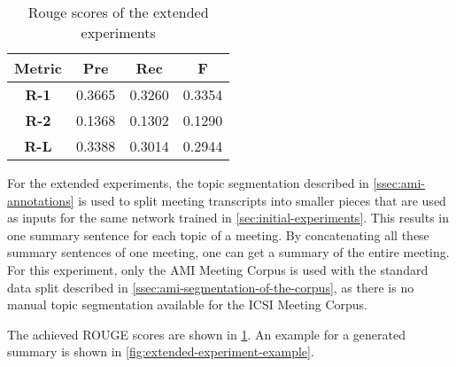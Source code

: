 \begin{table}[h]
\centering
\begin{tabular}{@{}clll@{}}
\toprule
\textbf{Metric} & \multicolumn{1}{c}{\textbf{Pre}} & \multicolumn{1}{c}{\textbf{Rec}} & \multicolumn{1}{c}{\textbf{F}} \\ \midrule
\textbf{R-1}    & 0.3665                           & 0.3260                           & 0.3354                         \\
\textbf{R-2}    & 0.1368                           & 0.1302                           & 0.1290                         \\
\textbf{R-L}    & 0.3388                           & 0.3014                           & 0.2944                         \\ \bottomrule
\end{tabular}
\caption{Rouge scores of the extended experiments}
\label{tab:extended-experiment-rouge}
\end{table}

For the extended experiments, the topic segmentation described in \cref{ssec:ami-annotations} is used to split meeting transcripts into smaller pieces that are used as inputs for the same network trained in \cref{sec:initial-experiments}.
This results in one summary sentence for each topic of a meeting.
By concatenating all these summary sentences of one meeting, one can get a summary of the entire meeting.
For this experiment, only the AMI Meeting Corpus is used with the standard data split described in \cref{ssec:ami-segmentation-of-the-corpus}, as there is no manual topic segmentation available for the ICSI Meeting Corpus. %

The achieved ROUGE scores are shown in \cref{tab:extended-experiment-rouge}.
An example for a generated summary is shown in \cref{fig:extended-experiment-example}.

